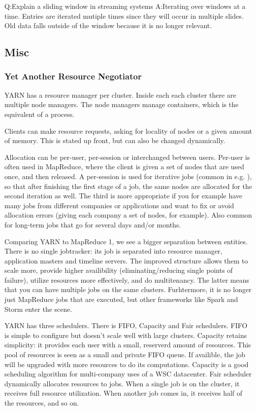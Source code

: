 Q:\@ Explain a sliding window in streaming systems
\newline A:\@ Iterating over windows at a time. Entries are  iterated mutiple times since they
will occur in multiple slides. Old data falls outside of the window because it is no longer relevant.

\subsection{Misc}
\subsubsection{Yet Another Resource Negotiator}\label{sec:YARN}
YARN has a resource manager per cluster. Inside each each cluster there are multiple
node managers. The node managers manage containers, which is the equivalent of 
a process.

Clients can make resource requests, asking for locality of nodes or a given amount of memory.
This is stated up front, but can also be changed dynamically.

Allocation can be per-user, per-session or interchanged between users.
Per-user is often used in MapReduce, where the client is given a set of nodes
that are used once, and then released.
A per-session is used for iterative jobs (common in e.g. ), so that
after finishing the first stage of a job, the same nodes are allocated for the second iteration as well.
The third is more appropriate if you for example have many jobs from different companies or applications
and want to fix or avoid allocation errors (giving each company a set of nodes, for example).
Also common for long-term jobs that go for several days and/or months.

Comparing YARN to MapReduce 1, we see a bigger separation between entities. There 
is no single jobtracker: its job is separated into resource manager, application masters
and timeline servers. The improved structure allows them to scale more, provide higher
availibility (eliminating/reducing single points of failure), utilize resources more effectively,
and do multitenancy. The latter means that you can have multiple jobs on the same clusters. Furhtermore,
it is no longer just MapReduce jobs that are executed, but other frameworks like Spark and Storm enter the scene.

YARN has three schedulers. There is FIFO, Capacity and Fair schedulers.
FIFO is simple to configure but doesn't scale well with large clusters.
Capacity retains simplicity: it provides each user with a small, reserverd amount of resources.
This pool of resources is seen as a small and private FIFO queue. If availible, the job will be upgraded
with more resources to do its computations. Capacity is a good scheduling algorithm for multi-company uses
of a WSC datacenter.  Fair scheduler dynamically allocates resources to jobs.
When a single job is on the cluster, it receives full resource utilization. When another job comes in,
it receives half of the resources, and so on.




